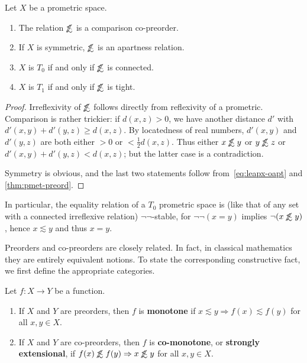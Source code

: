 \documentclass{article}
\def\oapt{\mathrel{\!\not\,\not\lesssim}}
\def\leapx{\lesssim}
\let\implies\Rightarrow
\begin{document}
\begin{thm}
  Let $X$ be a prometric space.
  \begin{enumerate}
  \item The relation $\oapt$ is a comparison co-preorder.  
  \item If $X$ is symmetric, $\oapt$ is an apartness relation.
  \item $X$ is $T_0$ if and only if $\oapt$ is connected.
  \item $X$ is $T_1$ if and only if $\oapt$ is tight.
  \end{enumerate}
\end{thm}
\begin{proof}
  Irreflexivity of $\oapt $ follows directly from reflexivity of a prometric.
  Comparison is rather trickier: if $d(x,z)>0$, we have another distance $d'$ with $d'(x,y)+d'(y,z)\ge d(x,z)$.
  By locatedness of real numbers, $d'(x,y)$ and $d'(y,z)$ are both either $>0$ or $<\frac12 d(x,z)$.
  Thus either $x\oapt y$ or $y\oapt z$ or $d'(x,y)+d'(y,z) < d(x,z)$; but the latter case is a contradiction.

  Symmetry is obvious, and the last two statements follow from~\eqref{eq:leapx-oapt} and \cref{thm:pmet-preord}.
\end{proof}

In particular, the equality relation of a $T_0$ prometric space is (like that of any set with a connected irreflexive relation) $\neg\neg$-stable, for $\neg\neg(x=y)$ implies $\neg(x\oapt y)$, hence $x\leapx y$ and thus $x=y$.

Preorders and co-preorders are closely related.
In fact, in classical mathematics they are entirely equivalent notions.
To state the corresponding constructive fact, we first define the appropriate categories.

\begin{defn}
  Let $f:X\to Y$ be a function.
  \begin{enumerate}
  \item If $X$ and $Y$ are preorders, then $f$ is \textbf{monotone} if $x\leapx y \implies f(x)\leapx f(y)$ for all $x,y\in X$.
  \item If $X$ and $Y$ are co-preorders, then $f$ is \textbf{co-monotone}, or \textbf{strongly extensional}, if $f(x)\oapt f(y) \implies x\oapt y$ for all $x,y\in X$.
  \end{enumerate}
\end{defn}
\end{document}
